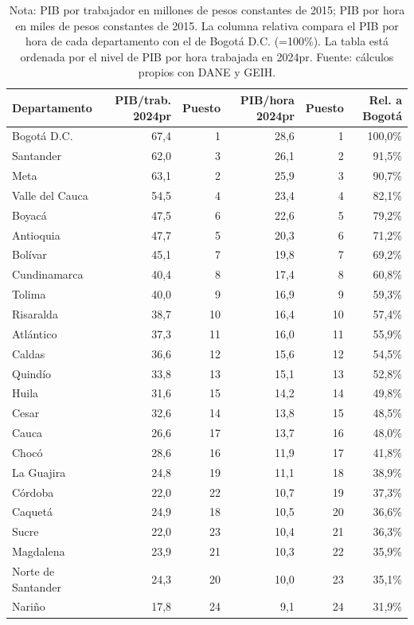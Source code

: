 \begin{table}[H]
\centering
\caption{Ranking departamental de niveles de productividad laboral, 2024pr}
\label{tab:pib_geih_productividad_departamento_ranking_niveles}
\scriptsize
\begin{tabular}{lrrrrr}
\toprule
Departamento & PIB/trab. 2024pr & Puesto & PIB/hora 2024pr & Puesto & Rel. a Bogotá \\
\midrule
Bogotá D.C. & 67,4 & 1 & 28,6 & 1 & 100,0\% \\
Santander & 62,0 & 3 & 26,1 & 2 & 91,5\% \\
Meta & 63,1 & 2 & 25,9 & 3 & 90,7\% \\
Valle del Cauca & 54,5 & 4 & 23,4 & 4 & 82,1\% \\
Boyacá & 47,5 & 6 & 22,6 & 5 & 79,2\% \\
Antioquia & 47,7 & 5 & 20,3 & 6 & 71,2\% \\
Bolívar & 45,1 & 7 & 19,8 & 7 & 69,2\% \\
Cundinamarca & 40,4 & 8 & 17,4 & 8 & 60,8\% \\
Tolima & 40,0 & 9 & 16,9 & 9 & 59,3\% \\
Risaralda & 38,7 & 10 & 16,4 & 10 & 57,4\% \\
Atlántico & 37,3 & 11 & 16,0 & 11 & 55,9\% \\
Caldas & 36,6 & 12 & 15,6 & 12 & 54,5\% \\
Quindío & 33,8 & 13 & 15,1 & 13 & 52,8\% \\
Huila & 31,6 & 15 & 14,2 & 14 & 49,8\% \\
Cesar & 32,6 & 14 & 13,8 & 15 & 48,5\% \\
Cauca & 26,6 & 17 & 13,7 & 16 & 48,0\% \\
Chocó & 28,6 & 16 & 11,9 & 17 & 41,8\% \\
La Guajira & 24,8 & 19 & 11,1 & 18 & 38,9\% \\
Córdoba & 22,0 & 22 & 10,7 & 19 & 37,3\% \\
Caquetá & 24,9 & 18 & 10,5 & 20 & 36,6\% \\
Sucre & 22,0 & 23 & 10,4 & 21 & 36,3\% \\
Magdalena & 23,9 & 21 & 10,3 & 22 & 35,9\% \\
Norte de Santander & 24,3 & 20 & 10,0 & 23 & 35,1\% \\
Nariño & 17,8 & 24 & 9,1 & 24 & 31,9\% \\
\bottomrule
\end{tabular}
\caption*{\footnotesize Nota: PIB por trabajador en millones de pesos constantes de 2015; PIB por hora en miles de pesos constantes de 2015. La columna relativa compara el PIB por hora de cada departamento con el de Bogotá D.C. (=100\%). La tabla está ordenada por el nivel de PIB por hora trabajada en 2024pr. Fuente: cálculos propios con DANE y GEIH.}
\end{table}